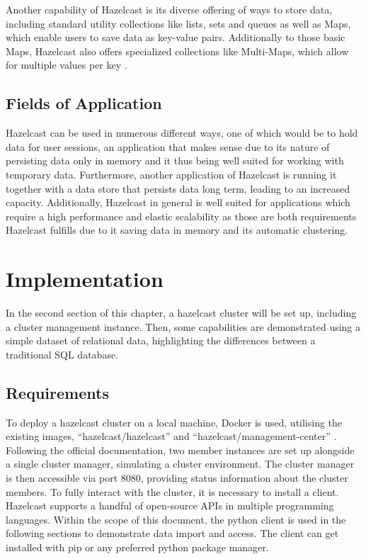 Another capability of Hazelcast is its diverse offering of ways to store data, including standard utility collections like lists, sets and queues as well as Maps, which enable users to save data as key-value pairs. Additionally to those basic Maps, Hazelcast also offers  
specialized collections like Multi-Maps, which allow for multiple values per key \parencite{Johns.2015}.
\subsection{Fields of Application} \label{subsec:fieldsOfApplicationHazelcast}

Hazelcast can be used in numerous different ways, one of which would be to hold data for user sessions, an application that makes sense due to its nature 
of persisting data only in memory and it thus being well suited for working with temporary data. Furthermore, another application of Hazelcast is 
running it together with a data store that persists data long term, leading to an increased capacity. Additionally, Hazelcast in general is well 
suited for applications which require a high performance and elastic scalability as those are both requirements Hazelcast fulfills due to it saving data in memory and 
its automatic clustering\parencite{Johns.2015}. \newline


\section{Implementation} \label{sec:implementationHazelcast}

In the second section of this chapter, a hazelcast cluster will be set up, including a cluster management 
instance. Then, some capabilities are demonstrated using a simple dataset of relational data, highlighting 
the differences between a traditional SQL database.

\subsection{Requirements} \label{subsec:requirementsHazelcast}

To deploy a hazelcast cluster on a local machine, Docker is used, utilising the existing images, 
\enquote{hazelcast/hazelcast} \textcite{Hazelcast.Docker.Hazelcast} and \enquote{hazelcast/management-center} 
\textcite{Hazelcast.Docker.ManagementCenter}. 
Following the official documentation, two member instances are set up alongside a single cluster manager, 
simulating a cluster environment. The cluster manager is then accessible via port 8080, providing status 
information about the cluster members. To fully interact with the cluster, it is necessary to install a 
client. Hazelcast supports a handful of open-source APIs in multiple programming languages. 
\textcite{Hazelcast.Clients} Within the scope of this document, the python client is 
used in the following sections to demonstrate data import and access. The client can get installed with pip 
or any preferred python package manager.

